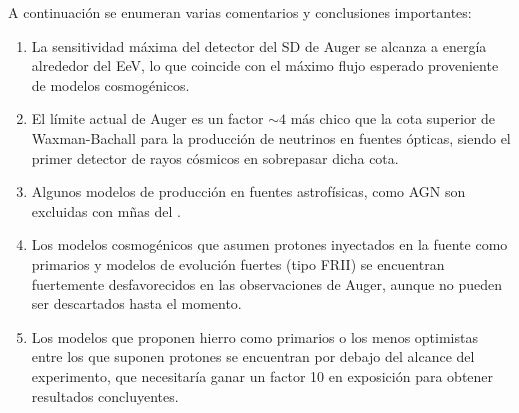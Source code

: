 	A continuaci\'on se enumeran varias comentarios y conclusiones importantes:
	\begin{enumerate}
	 \item La sensitividad m\'axima del detector del SD de Auger se alcanza a energ\'ia alrededor del EeV, lo que coincide con el m\'aximo flujo esperado proveniente de modelos cosmog\'enicos.
	 \item El l\'imite actual de Auger es un factor $\sim4$ m\'as chico que la cota superior de Waxman-Bachall para la producci\'on de neutrinos en fuentes \'opticas, siendo el primer detector de rayos c\'osmicos en sobrepasar dicha cota.
	 \item Algunos modelos de producci\'on en fuentes astrof\'isicas, como AGN son excluidas con m\~nas del .
	 \item Los modelos cosmog\'enicos que asumen protones inyectados en la fuente como primarios y modelos de evoluci\'on fuertes (tipo FRII) se encuentran fuertemente desfavorecidos en las observaciones de Auger, aunque no pueden ser descartados hasta el momento.
	 \item Los modelos que proponen hierro como primarios o los menos optimistas entre los que suponen protones se encuentran por debajo del alcance del experimento, que necesitar\'ia ganar un factor 10 en exposici\'on para obtener resultados concluyentes.
	\end{enumerate}
	
